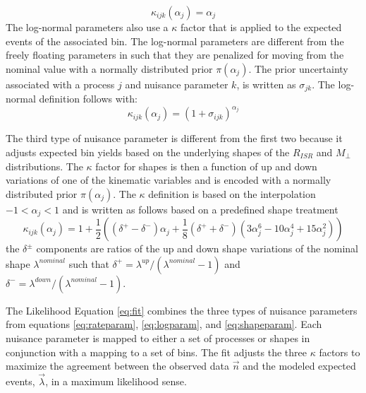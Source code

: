 \begin{equation}
\label{eq:rateparam}
\kappa_{ijk}(\alpha_j) = \alpha_j
\end{equation}  
The log-normal parameters also use a $\kappa$ factor that is applied to the expected events of the associated bin. The log-normal parameters are different from the freely floating parameters in such that they are penalized for moving from the nominal value with a normally distributed prior $\pi(\alpha_j)$. The prior uncertainty associated with a process $j$ and nuisance parameter $k$, is written as $\sigma_{jk}$. The log-normal definition follows with:
\begin{equation}
\label{eq:logparam}
\kappa_{ijk}(\alpha_j) = (1+\sigma_{ijk})^{\alpha_j}
\end{equation}

The third type of nuisance parameter is different from the first two because it adjusts expected bin yields based on the underlying shapes of the $R_{ISR}$ and $M_\perp$ distributions. The $\kappa$ factor for shapes is then a function of up and down variations of one of the kinematic variables and is encoded with a normally distributed prior $\pi(\alpha_j)$. The $\kappa$ definition is based on the interpolation $-1<\alpha_j<1$ and is written as follows based on a predefined shape treatment \cite{Conway:2011in}
\begin{equation}
\label{eq:shapeparam}
\kappa_{ijk}(\alpha_j)= 1 + \frac{1}{2}((\delta^+ - \delta^-)\alpha_j + \frac{1}{8}(\delta^+ + \delta^-)(3\alpha_j^6-10\alpha_j^4+15\alpha_j^2))
\end{equation}
the $\delta^\pm$ components are ratios of the up and down shape variations of the nominal shape $\lambda^{nominal}$ such that $\delta^+ = \lambda^{up}/(\lambda^{nominal}-1)$ and $\delta^- = \lambda^{down}/(\lambda^{nominal}-1).$

The Likelihood Equation \ref{eq:fit} combines the three types of nuisance parameters from equations \ref{eq:rateparam}, \ref{eq:logparam}, and \ref{eq:shapeparam}. Each nuisance parameter is mapped to either a set of processes or shapes in conjunction with a mapping to a set of bins. The fit adjusts the three $\kappa$ factors to maximize the agreement between the observed data $\vec{n}$ and the modeled expected events, $\vec{\lambda}$, in a maximum likelihood sense. 


